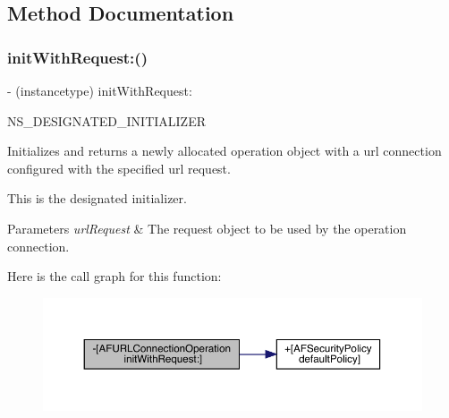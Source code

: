 \subsection{Method Documentation}
\mbox{\label{interface_a_f_u_r_l_connection_operation_aa9923ab9910d684883ff1098b0db9e35}} 
\subsubsection{\texorpdfstring{init\+With\+Request\+:()}{initWithRequest:()}\hspace{0.1cm}{\footnotesize\ttfamily [1/3]}}
{\footnotesize\ttfamily -\/ (instancetype) init\+With\+Request\+: \begin{DoxyParamCaption}\item[{(N\+S\+U\+R\+L\+Request $\ast$)}]{N\+S\+\_\+\+D\+E\+S\+I\+G\+N\+A\+T\+E\+D\+\_\+\+I\+N\+I\+T\+I\+A\+L\+I\+Z\+ER }\end{DoxyParamCaption}}

Initializes and returns a newly allocated operation object with a url connection configured with the specified url request.

This is the designated initializer.


\begin{DoxyParams}{Parameters}
{\em url\+Request} & The request object to be used by the operation connection. \\
\hline
\end{DoxyParams}
Here is the call graph for this function\+:\nopagebreak
\begin{figure}[H]
\begin{center}
\leavevmode
\includegraphics[width=350pt]{interface_a_f_u_r_l_connection_operation_aa9923ab9910d684883ff1098b0db9e35_cgraph}
\end{center}
\end{figure}
\mbox{\label{interface_a_f_u_r_l_connection_operation_aa9923ab9910d684883ff1098b0db9e35}} 
